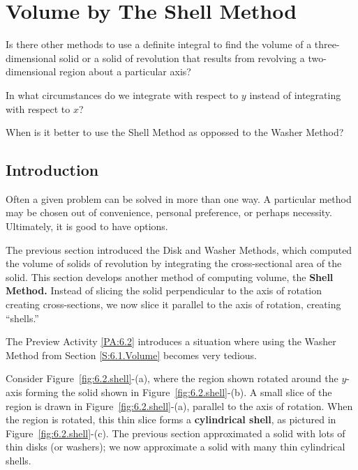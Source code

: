 \section{Volume by The Shell Method} \label{S:6.2.ShellMethod}

\begin{goals}
\item Is there other methods to use a definite integral to find the volume of a three-dimensional solid  or a solid of revolution that results from revolving a two-dimensional region about a particular axis? 
\item In what circumstances do we integrate with respect to $y$ instead of integrating with respect to $x$?
\item When is it better to use the Shell Method as oppossed to the Washer Method? 
\end{goals}

\subsection*{Introduction}

Often a given problem can be solved in more than one way. A particular method may be chosen out of convenience, personal preference, or perhaps necessity. Ultimately, it is good to have options.

The previous section introduced the Disk and Washer Methods, which computed the volume of solids of revolution by integrating the cross-sectional area of the solid. This section develops another method of computing volume, the \textbf{Shell Method.} Instead of slicing the solid perpendicular to the axis of rotation creating cross-sections, we now slice it parallel to the axis of rotation, creating ``shells.''

The Preview Activity \ref{PA:6.2} introduces a situation where using the Washer Method from Section \ref{S:6.1.Volume} becomes very tedious. 


Consider Figure~\ref{fig:6.2.shell}-(a), where the region shown rotated around the $y$-axis forming the solid shown in Figure~\ref{fig:6.2.shell}-(b). A small slice of the region is drawn in Figure~\ref{fig:6.2.shell}-(a), parallel to the axis of rotation. When the region is rotated, this thin slice forms a \textbf{cylindrical shell}, as pictured in Figure~\ref{fig:6.2.shell}-(c). The previous section approximated a solid with lots of thin disks (or washers); we now approximate a solid with many thin cylindrical shells. 

